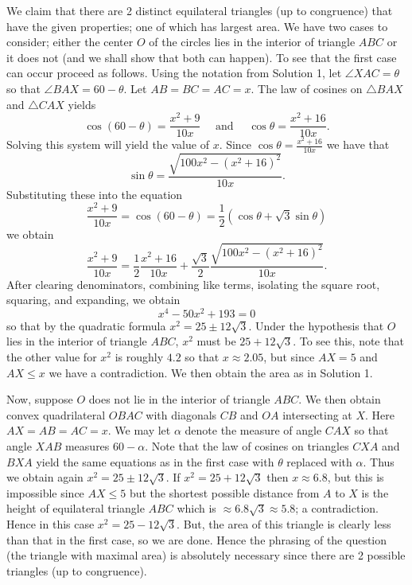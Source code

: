 \begin{enumerate}
 We claim that there are 2 distinct equilateral triangles (up to congruence) that have the given properties; one of which has largest area. We have two cases to consider; either the center $O$ of the circles lies in the interior of triangle $ABC$ or it does not (and we shall show that both can happen). To see that the first case can occur proceed as follows. Using the notation from Solution 1, let $\angle XAC = \theta$ so that  $\angle BAX=60-\theta$. Let $AB=BC=AC=x$. The law of cosines on $\triangle BAX$ and $\triangle CAX$ yields 
 \[\cos(60-\theta)=\frac{x^2+9}{10x}\quad \text{ and }\quad  \cos\theta=\frac{x^2+16}{10x}.\] Solving this system will yield the value of $x$. Since $\cos\theta=\frac{x^2+16}{10x}$ we have that 
 \[\sin\theta=\frac{\sqrt{100x^2-(x^2+16)^2}}{10x}.\] Substituting these into the equation 
 \[\frac{x^2+9}{10x}=\cos(60-\theta)=\frac{1}{2}(\cos\theta+ \sqrt{3}\sin\theta)\] we obtain 
 \[\frac{x^2+9}{10x}=\frac{1}{2}\frac{x^2+16}{10x}+\frac{\sqrt{3}}{2}\frac{\sqrt{100x^2-(x^2+16)^2}}{10x}.\] After clearing denominators, combining like terms, isolating the square root, squaring, and expanding, we obtain 
 \[x^4-50x^2+193=0\] so that by the quadratic formula $x^2=25\pm12\sqrt{3}$. Under the hypothesis that $O$ lies in the interior of triangle $ABC$, $x^2$ must be $25+12\sqrt{3}$. To see this, note that the other value for $x^2$ is roughly $4.2$ so that $x\approx 2.05$, but since $AX=5$ and $AX\leq x$ we have a contradiction. We then obtain the area as in Solution 1.

 Now, suppose $O$ does not lie in the interior of triangle $ABC$. We then obtain convex quadrilateral $OBAC$ with diagonals $CB$ and $OA$ intersecting at $X$. Here $AX=AB=AC=x$. We may let $\alpha$ denote the measure of angle $CAX$ so that angle $XAB$ measures $60-\alpha$. Note that the law of cosines on triangles $CXA$ and $BXA$ yield the same equations as in the first case with $\theta$ replaced with $\alpha$. Thus we obtain again $x^2=25\pm12\sqrt{3}$. If $x^2=25+12\sqrt{3}$ then $x\approx 6.8$, but this is impossible since $AX\leq 5$ but the shortest possible distance from $A$ to $X$ is the height of equilateral triangle $ABC$ which is $\approx6.8\sqrt{3}\approx5.8$; a contradiction. Hence in this case $x^2=25-12\sqrt{3}$.  But, the area of this triangle is clearly less than that in the first case, so we are done. Hence the phrasing of the question (the triangle with maximal area) is absolutely necessary since there are 2 possible triangles (up to congruence).

 




\end{enumerate}
